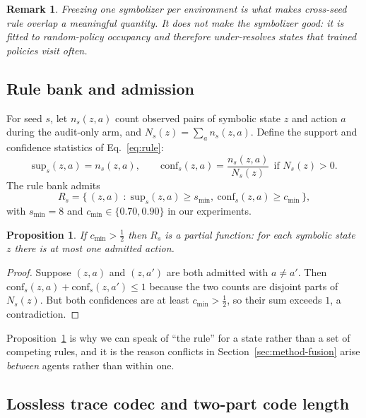 \documentclass[11pt,a4paper]{article}
\newtheorem{proposition}{Proposition}
\newtheorem{remark}{Remark}
\begin{document}
\begin{remark}
Freezing one symbolizer per environment is what makes cross-seed rule overlap a meaningful quantity. It does not make the symbolizer good: it is fitted to random-policy occupancy and therefore under-resolves states that trained policies visit often.
\end{remark}

\subsection{Rule bank and admission}
\label{sec:method-rule}

For seed $s$, let $n_{s}(z,a)$ count observed pairs of symbolic state $z$ and action $a$ during the audit-only arm, and $N_{s}(z)=\sum_{a}n_{s}(z,a)$. Define the support and confidence statistics of Eq.~\eqref{eq:rule}:
\begin{equation}
\label{eq:rule}
\mathrm{sup}_{s}(z,a) = n_{s}(z,a),
\qquad
\mathrm{conf}_{s}(z,a) = \frac{n_{s}(z,a)}{N_{s}(z)}\ \ \text{if } N_{s}(z)>0 .
\end{equation}
The rule bank admits
\begin{equation}
\label{eq:admit}
R_{s} = \bigl\{\, (z,a)\;:\; \mathrm{sup}_{s}(z,a)\ge s_{\min},\ \mathrm{conf}_{s}(z,a)\ge c_{\min} \,\bigr\},
\end{equation}
with $s_{\min}=8$ and $c_{\min}\in\{0.70,0.90\}$ in our experiments.

\begin{proposition}
\label{prop:partial}
If $c_{\min}>\tfrac12$ then $R_{s}$ is a partial function: for each symbolic state $z$ there is at most one admitted action.
\end{proposition}

\begin{proof}
Suppose $(z,a)$ and $(z,a')$ are both admitted with $a\neq a'$. Then $\mathrm{conf}_{s}(z,a)+\mathrm{conf}_{s}(z,a') \le 1$ because the two counts are disjoint parts of $N_{s}(z)$. But both confidences are at least $c_{\min}>\tfrac12$, so their sum exceeds $1$, a contradiction.
\end{proof}

Proposition~\ref{prop:partial} is why we can speak of ``the rule'' for a state rather than a set of competing rules, and it is the reason conflicts in Section~\ref{sec:method-fusion} arise \emph{between} agents rather than within one.

\subsection{Lossless trace codec and two-part code length}
\label{sec:method-codec}
\end{document}
